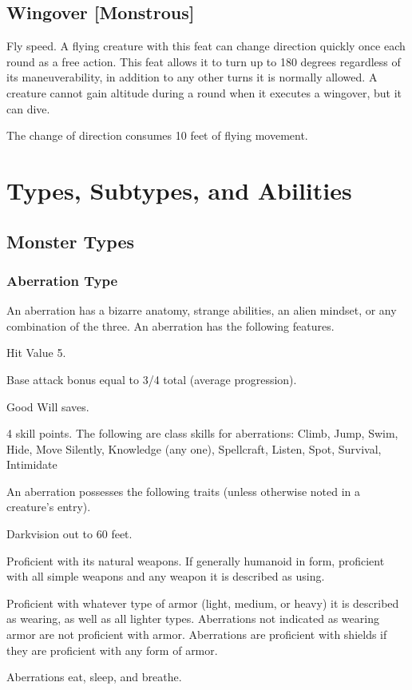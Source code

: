 {\subsection{Wingover [Monstrous]}
 Fly speed.
 A flying creature with this feat can change direction quickly once each round as a free action. This feat allows it to turn up to 180 degrees regardless of its maneuverability, in addition to any other turns it is normally allowed. A creature cannot gain altitude during a round when it executes a wingover, but it can dive.

The change of direction consumes 10 feet of flying movement.

\section{Types, Subtypes, and Abilities}


\subsection{Monster Types}
\subsubsection{Aberration Type} An aberration has a bizarre anatomy, strange abilities, an alien mindset, or any combination of the three.
 An aberration has the following features.
\begin{itemize*}
\item Hit Value 5.
\item Base attack bonus equal to 3/4 total  (average progression).
\item Good Will saves.
\item 4 skill points. The following are class skills for aberrations: Climb, Jump, Swim, Hide, Move Silently, Knowledge (any one), Spellcraft, Listen, Spot, Survival, Intimidate 
\end{itemize*}
 An aberration possesses the following traits (unless otherwise noted in a creature's entry).
\begin{itemize*}
\item Darkvision out to 60 feet.
\item Proficient with its natural weapons. If generally humanoid in form, proficient with all simple weapons and any weapon  it is described as using.
\item Proficient with whatever type of armor (light, medium, or heavy) it is described as wearing, as well as all lighter types. Aberrations not indicated as wearing armor are not proficient with armor. Aberrations are proficient with shields if they are proficient with any form of armor.
\item Aberrations eat, sleep, and breathe.
\end{itemize*}

}
